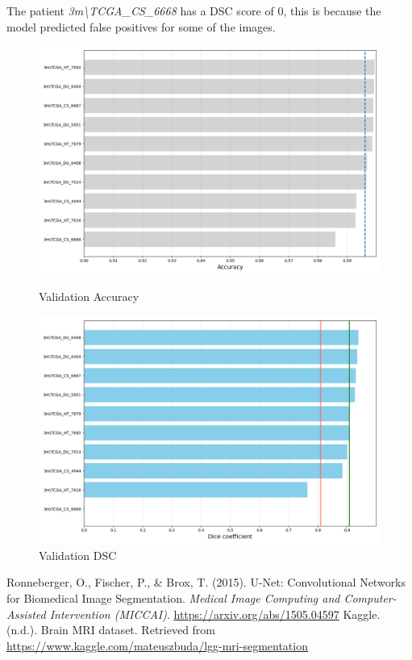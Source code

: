 \documentclass[11pt,a4paper]{article}
\begin{document}
The patient \textit{3m\textbackslash TCGA\_CS\_6668} has a DSC score of 0, this is because the model predicted false positives for some of the images.
\begin{figure}[H]
    \centering
    \begin{minipage}[t]{0.48\textwidth}
        \centering
        \includegraphics[width=\linewidth]{./img/validation_accuracy.png}
        \caption{Validation Accuracy}
        \label{fig:validation_accuracy}
    \end{minipage}
    \hfill
    \begin{minipage}[t]{0.48\textwidth}
        \centering
        \includegraphics[width=\linewidth]{./img/validation_dsc.png}
        \caption{Validation DSC}
        \label{fig:validation_dsc}
    \end{minipage}
\end{figure}


\begin{thebibliography}{9}
Ronneberger, O., Fischer, P., \& Brox, T. (2015). U-Net: Convolutional Networks for Biomedical Image Segmentation. \textit{Medical Image Computing and Computer-Assisted Intervention (MICCAI)}. \url{https://arxiv.org/abs/1505.04597}
Kaggle. (n.d.). Brain MRI dataset. Retrieved from \url{https://www.kaggle.com/mateuszbuda/lgg-mri-segmentation}
\end{thebibliography}
\end{document}
